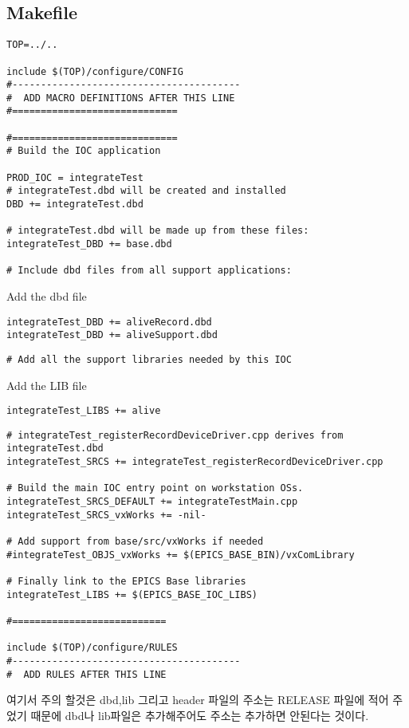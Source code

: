 \documentclass[11pt
  , a4paper
  , article
  , oneside
]{memoir}
\begin{document}
\subsection{Makefile}
\begin{lstlisting}[style=termstyle]
TOP=../..

include $(TOP)/configure/CONFIG
#----------------------------------------
#  ADD MACRO DEFINITIONS AFTER THIS LINE
#=============================

#=============================
# Build the IOC application

PROD_IOC = integrateTest
# integrateTest.dbd will be created and installed
DBD += integrateTest.dbd

# integrateTest.dbd will be made up from these files:
integrateTest_DBD += base.dbd

# Include dbd files from all support applications:
\end{lstlisting}
Add the dbd file
\begin{lstlisting}[style=termstyle]
integrateTest_DBD += aliveRecord.dbd
integrateTest_DBD += aliveSupport.dbd
\end{lstlisting}
\begin{lstlisting}[style=termstyle]
# Add all the support libraries needed by this IOC
\end{lstlisting}
Add the LIB file
\begin{lstlisting}[style=termstyle]
integrateTest_LIBS += alive
\end{lstlisting}
\begin{lstlisting}[style=termstyle]
# integrateTest_registerRecordDeviceDriver.cpp derives from integrateTest.dbd
integrateTest_SRCS += integrateTest_registerRecordDeviceDriver.cpp

# Build the main IOC entry point on workstation OSs.
integrateTest_SRCS_DEFAULT += integrateTestMain.cpp
integrateTest_SRCS_vxWorks += -nil-

# Add support from base/src/vxWorks if needed
#integrateTest_OBJS_vxWorks += $(EPICS_BASE_BIN)/vxComLibrary

# Finally link to the EPICS Base libraries
integrateTest_LIBS += $(EPICS_BASE_IOC_LIBS)

#===========================

include $(TOP)/configure/RULES
#----------------------------------------
#  ADD RULES AFTER THIS LINE
\end{lstlisting}
여기서 주의 할것은 dbd,lib 그리고 header 파일의 주소는 RELEASE 파일에 적어 주었기 때문에 dbd나 lib파일은 추가해주어도 주소는 추가하면 안된다는 것이다.
\end{document}
